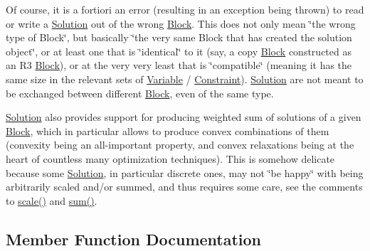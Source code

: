 Of course, it is a fortiori an error (resulting in an exception being thrown) to read or write a \mbox{\hyperlink{class_s_m_spp__di__unipi__it_1_1_solution}{Solution}} out of the wrong \mbox{\hyperlink{class_s_m_spp__di__unipi__it_1_1_block}{Block}}. This does not only mean \char`\"{}the wrong type of Block\char`\"{}, but basically \char`\"{}the very same Block
that has created the solution object\char`\"{}, or at least one that is \char`\"{}identical\char`\"{} to it (say, a copy \mbox{\hyperlink{class_s_m_spp__di__unipi__it_1_1_block}{Block}} constructed as an R3 \mbox{\hyperlink{class_s_m_spp__di__unipi__it_1_1_block}{Block}}), or at the very very least that is \char`\"{}compatible\char`\"{} (meaning it has the same size in the relevant sets of \mbox{\hyperlink{class_s_m_spp__di__unipi__it_1_1_variable}{Variable}} / \mbox{\hyperlink{class_s_m_spp__di__unipi__it_1_1_constraint}{Constraint}}). \mbox{\hyperlink{class_s_m_spp__di__unipi__it_1_1_solution}{Solution}} are not meant to be exchanged between different \mbox{\hyperlink{class_s_m_spp__di__unipi__it_1_1_block}{Block}}, even of the same type.

\mbox{\hyperlink{class_s_m_spp__di__unipi__it_1_1_solution}{Solution}} also provides support for producing weighted sum of solutions of a given \mbox{\hyperlink{class_s_m_spp__di__unipi__it_1_1_block}{Block}}, which in particular allows to produce convex combinations of them (convexity being an all-\/important property, and convex relaxations being at the heart of countless many optimization techniques). This is somehow delicate because some \mbox{\hyperlink{class_s_m_spp__di__unipi__it_1_1_solution}{Solution}}, in particular discrete ones, may not \char`\"{}be happy\char`\"{} with being arbitrarily scaled and/or summed, and thus requires some care, see the comments to \mbox{\hyperlink{class_s_m_spp__di__unipi__it_1_1_solution_abf1a2d1763f128a72b2677d4b9ff4d3b}{scale()}} and \mbox{\hyperlink{class_s_m_spp__di__unipi__it_1_1_solution_adc2450947fd142657637bf79d91505a9}{sum()}}. 

\subsection{Member Function Documentation}
\mbox{\label{class_s_m_spp__di__unipi__it_1_1_solution_a02ecf9046100701d7bcc800deaa5717b}} 
